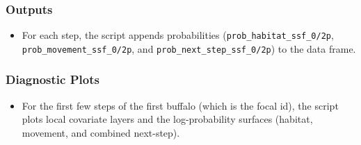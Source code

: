 \documentclass[
  letterpaper,
  DIV=11,
  numbers=noendperiod]{scrartcl}
\providecommand{\tightlist}{%
  \setlength{\itemsep}{0pt}\setlength{\parskip}{0pt}}
\begin{document}
\subsubsection{\texorpdfstring{\textbf{Outputs}}{Outputs}}\label{outputs}

\begin{itemize}
\tightlist
\item
  For each step, the script appends probabilities
  (\texttt{prob\_habitat\_ssf\_0/2p},
  \texttt{prob\_movement\_ssf\_0/2p}, and
  \texttt{prob\_next\_step\_ssf\_0/2p}) to the data frame.
\end{itemize}

\subsubsection{\texorpdfstring{\textbf{Diagnostic
Plots}}{Diagnostic Plots}}\label{diagnostic-plots}

\begin{itemize}
\tightlist
\item
  For the first few steps of the first buffalo (which is the focal id),
  the script plots local covariate layers and the log-probability
  surfaces (habitat, movement, and combined next-step).
\end{itemize}
\end{document}
